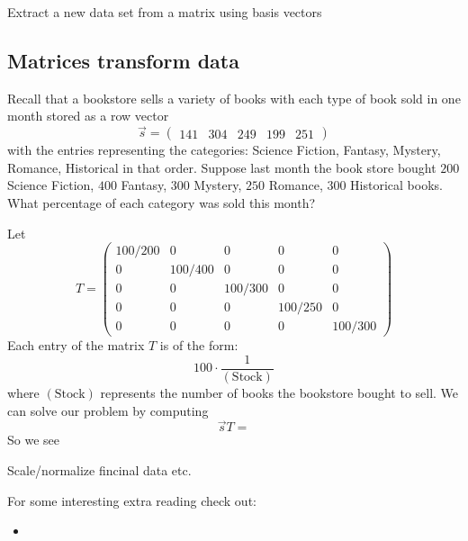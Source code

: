 \documentclass{ximera}
\begin{document}
\begin{example}
Extract a new data set from a matrix using basis vectors
\end{example}


\begin{example}
\end{example}



\subsection{Matrices transform data}


\begin{example}
  Recall that a bookstore sells a variety of books with each type of
  book sold in one month stored as a row vector
  \[
  \vec{s} = \begin{pmatrix}141 & 304 & 249 & 199 & 251 \end{pmatrix}
  \]
  with the entries representing the categories: Science Fiction,
  Fantasy, Mystery, Romance, Historical in that order.  Suppose last
  month the book store bought $200$ Science Fiction, $400$ Fantasy, $300$
  Mystery, $250$ Romance, $300$ Historical books. What percentage of each
  category was sold this month?
  \begin{explanation}
    Let
    \[
    T =
    \begin{pmatrix}
      100/200 & 0 &    0   &   0    &   0 \\
      0 & 100/400 &    0   &   0    &   0 \\
      0 &   0   &  100/300 &   0    &   0 \\
      0 &   0   &    0   & 100/250  &   0 \\
      0 &   0   &    0   &   0    & 100/300
    \end{pmatrix}
    \]
    Each entry of the matrix $T$ is of the form:
    \[
    100 \cdot \frac{1}{(\text{Stock})}
    \]
    where $(\text{Stock})$ represents the number of books the
    bookstore bought to sell.  We can solve our problem by computing
    \[
    \vec{s} T =
    \]
    So we see
  \end{explanation}

\end{example}




\begin{example}[Navigation]
  Scale/normalize fincinal data etc.
\end{example}



For some interesting extra reading check out:
\begin{itemize}
\item {}
\end{itemize}
\end{document}
